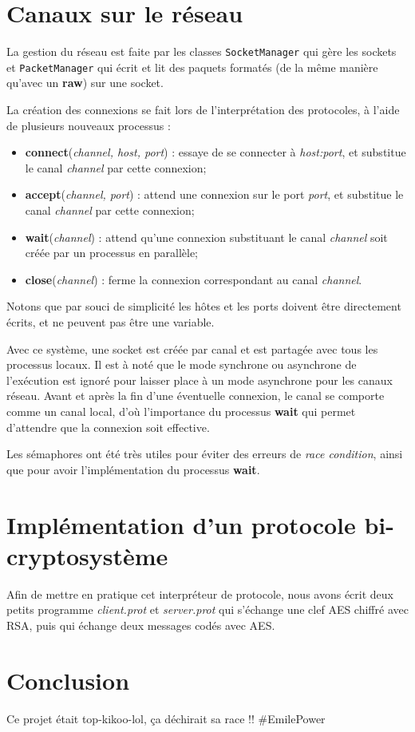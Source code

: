\documentclass[11pt]{article} %
\begin{document}
\section{Canaux sur le réseau}

La gestion du réseau est faite par les classes \texttt{SocketManager} qui gère les sockets et \texttt{PacketManager} qui écrit et lit des paquets formatés (de la même manière qu'avec un \textbf{raw}) sur une socket.

La création des connexions se fait lors de l'interprétation des protocoles, à l'aide de plusieurs nouveaux processus :
\begin{itemize}
  \item \textbf{connect}(\emph{channel, host, port}) : essaye de se connecter à \emph{host:port}, et substitue le canal \emph{channel} par cette connexion;
  \item \textbf{accept}(\emph{channel, port}) : attend une connexion sur le port \emph{port}, et substitue le canal \emph{channel} par cette connexion;
  \item \textbf{wait}(\emph{channel}) : attend qu'une connexion substituant le canal \emph{channel} soit créée par un processus en parallèle;
  \item \textbf{close}(\emph{channel}) : ferme la connexion correspondant au canal \emph{channel}.
\end{itemize}

Notons que par souci de simplicité les hôtes et les ports doivent être directement écrits, et ne peuvent pas être une variable.

Avec ce système, une socket est créée par canal et est partagée avec tous les processus locaux. Il est à noté que le mode synchrone ou asynchrone de l’exécution est ignoré pour laisser place à un mode asynchrone pour les canaux réseau. Avant et après la fin d'une éventuelle connexion, le canal se comporte comme un canal local, d'où l'importance du processus \textbf{wait} qui permet d'attendre que la connexion soit effective.

Les sémaphores ont été très utiles pour éviter des erreurs de \emph{race condition}, ainsi que pour avoir l'implémentation du processus \textbf{wait}.

\section{Implémentation d'un protocole bi-cryptosystème}

Afin de mettre en pratique cet interpréteur de protocole, nous avons écrit deux petits programme \emph{client.prot} et \emph{server.prot} qui s'échange une clef AES chiffré avec RSA, puis qui échange deux messages codés avec AES.

\section{Conclusion}

Ce projet était top-kikoo-lol, ça déchirait sa race !!
\#EmilePower
\end{document}
